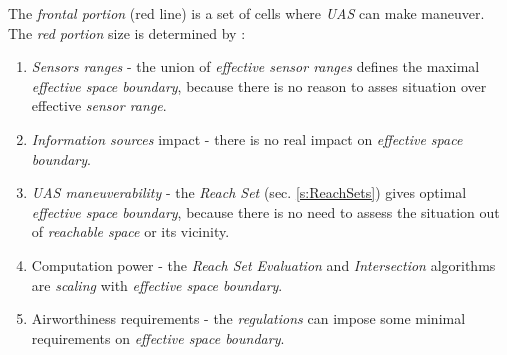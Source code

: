 \newpage
The \emph{frontal portion} (red line) is a set of cells where \emph{UAS} can make maneuver. The \emph{red portion} size is determined by \cite{zaiane2002clustering}:

\begin{enumerate}
        \item \emph{Sensors ranges} - the union of \emph{effective sensor ranges} defines the maximal \emph{effective space boundary}, because there is no reason to asses situation over effective \emph{sensor range}.
        
        \item \emph{Information sources} impact - there is no real impact on \emph{effective space boundary}.
        
        \item \emph{UAS maneuverability} - the \emph{Reach Set} (sec. \ref{s:ReachSets}) gives optimal \emph{effective space boundary}, because there is no need to assess the situation out of \emph{reachable space} or its vicinity. 
        
        \item Computation power - the \emph{Reach Set Evaluation} and \emph{Intersection} algorithms are \emph{scaling} with \emph{effective space boundary}.
        
        \item Airworthiness requirements - the \emph{regulations} can impose some minimal requirements on \emph{effective space boundary}.
\end{enumerate}


